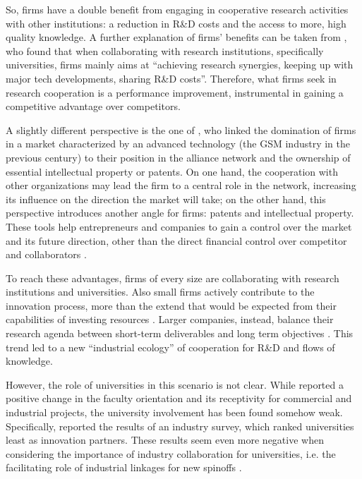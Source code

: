 So, firms have a double benefit from engaging in cooperative research activities with other institutions: a reduction in R\&D costs and the access to more, high quality knowledge. A further explanation of firms' benefits can be taken from \citet{Caloghirou2001}, who found that when collaborating with research institutions, specifically universities, firms mainly aims at \enquote{achieving research synergies, keeping up with major tech developments, sharing R\&D costs}. Therefore, what firms seek in research cooperation is a performance improvement, instrumental in gaining a competitive advantage over competitors. 

A slightly different perspective is the one of \citet{Bekkers2002}, who linked the domination of firms in a market characterized by an advanced technology (the GSM industry in the previous century) to their position in the alliance network and the ownership of essential intellectual property or patents. On one hand, the cooperation with other organizations may lead the firm to a central role in the network, increasing its influence on the direction the market will take; on the other hand, this perspective introduces another angle for firms: patents and intellectual property. These tools help entrepreneurs and companies to gain a control over the market and its future direction, other than the direct financial control over competitor and collaborators \citep{Siegel2003a}. 

To reach these advantages, firms of every size are collaborating with research institutions and universities. Also small firms actively contribute to the innovation process, more than the extend that would be expected from their capabilities of investing resources \citep{Audretsch2005}. Larger companies, instead, balance their research agenda between short-term deliverables and long term objectives \citep{Tijssen2006}. This trend led to a new \enquote{industrial ecology} of cooperation for R\&D and flows of knowledge.

However, the role of universities in this scenario is not clear. While \citet{Thursby2002} reported a positive change in the faculty orientation and its receptivity for commercial and industrial projects, the university involvement has been found somehow weak. Specifically, \citet{Yusuf2008} reported the results of an industry survey, which ranked universities least as innovation partners. These results seem even more negative when considering the importance of industry collaboration for universities, i.e. the facilitating role of industrial linkages for new spinoffs \citep{OShea2005}.

